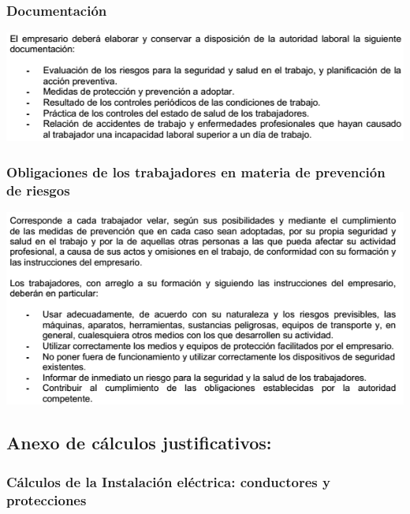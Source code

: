 \subsubsection{Documentación}
\includegraphics[width=15cm,keepaspectratio]{Memoria/EBSS/9.png}
\subsubsection{Obligaciones de los trabajadores en materia de prevención de riesgos}
\includegraphics[width=15cm,keepaspectratio]{Memoria/EBSS/10.png}

\newpage




\subsection{Anexo de cálculos justificativos:}
\label{sec:Calculos}

\subsubsection{Cálculos de la Instalación eléctrica: conductores y protecciones}




\pagebreak



\pagebreak



